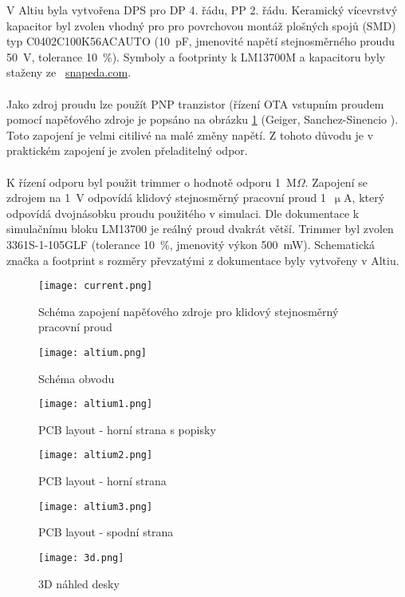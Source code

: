 \noindent V Altiu byla vytvořena DPS pro DP 4. řádu, PP 2. řádu. Keramický vícevrstvý kapacitor byl zvolen vhodný pro pro povrchovou montáž plošných spojů (SMD) typ C0402C100K56ACAUTO (10~pF, jmenovité napětí stejnosměrného proudu 50~V, tolerance 10~\%). Symboly a footprinty k LM13700M a kapacitoru byly staženy ze~ \url{snapeda.com}. \\
\\
Jako zdroj proudu lze použít PNP tranzistor (řízení OTA vstupním proudem pomocí napěťového zdroje je popsáno na obrázku \ref{s:DC} (Geiger, Sanchez-Sinencio \cite{25}). Toto zapojení je velmi citilivé na malé změny napětí. Z tohoto důvodu je v praktickém zapojení je zvolen přeladitelný odpor. \\
\\
K řízení odporu byl použit trimmer o hodnotě odporu 1~M$\Omega$. Zapojení se zdrojem na 1~V odpovídá klidový stejnosměrný pracovní proud 1~$\upmu$A, který odpovídá dvojnásobku proudu použitého v simulaci. Dle dokumentace k simulačnímu bloku LM13700 je reálný proud dvakrát větší. Trimmer byl zvolen 3361S-1-105GLF (tolerance 10~\%, jmenovitý výkon 500~mW). Schematická značka a footprint s rozměry převzatými z dokumentace byly vytvořeny v Altiu.
\begin{figure}[h]
\centering
\texttt{[image: current.png]}
\caption{Schéma zapojení napěťového zdroje pro klidový stejnosměrný pracovní proud \label{s:DC}}
\end{figure}
\begin{figure}[h]
\centering
\texttt{[image: altium.png]}
\caption{Schéma obvodu}
\end{figure}
\begin{figure}[h]
\centering
\texttt{[image: altium1.png]}
\caption{PCB layout - horní strana s popisky}
\end{figure}
\begin{figure}[h]
\centering
\texttt{[image: altium2.png]}
\caption{PCB layout - horní strana}
\end{figure}
\begin{figure}[h]
\centering
\texttt{[image: altium3.png]}
\caption{PCB layout - spodní strana}
\end{figure}
\begin{figure}[h]
\centering
\texttt{[image: 3d.png]}
\caption{3D náhled desky}
\end{figure}